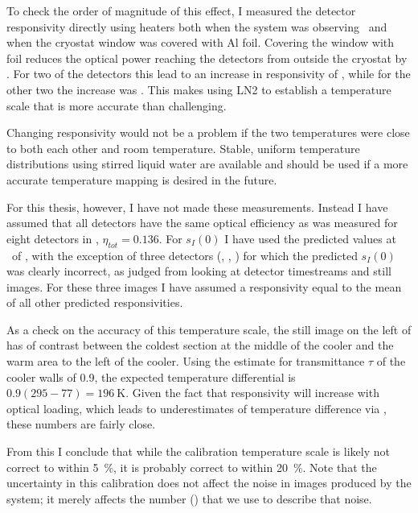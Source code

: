 To check the order of magnitude of this effect, I measured the detector responsivity directly using heaters both when the system was observing \ecco\ and when the cryostat window was covered with Al foil.
Covering the window with foil reduces the optical power reaching the detectors from outside the cryostat by .
For two of the detectors this lead to an increase in responsivity of , while for the other two the increase was .
This makes using LN2 to establish a temperature scale that is more accurate than  challenging.

Changing responsivity would not be a problem if the two temperatures were close to both each other and room temperature.
Stable, uniform temperature distributions using stirred liquid water are available \cite{dietlein_aqueous_2008} and should be used if a more accurate temperature mapping is desired in the future.

For this thesis, however, I have not made these measurements.
Instead I have assumed that all detectors have the same optical efficiency as was measured for eight detectors in , $\eta_{tot} = 0.136$.
For $s_I(0)$ I have used the predicted values at \SOC\ of , with the exception of three detectors (, , ) for which the predicted $s_I(0)$ was clearly incorrect, as judged from looking at detector timestreams and still images.
For these three images I have assumed a responsivity equal to the mean of all other predicted responsivities.

As a check on the accuracy of this temperature scale, the still image on the left of  has  of contrast between the coldest section at the middle of the cooler and the warm area to the left of the cooler.
Using the estimate for transmittance $\tau$ of the cooler walls of \num{0.9}, the expected temperature differential is $0.9(295-77) = \SI{196}{\K}$.
Given the fact that responsivity will increase with optical loading, which leads to underestimates of temperature difference via , these numbers are fairly close.

From this I conclude that while the calibration temperature scale is likely not correct to within \SI{5}{\percent}, it is probably correct to within \SI{20}{\percent}.
Note that the uncertainty in this calibration does not affect the noise in images produced by the system; it merely affects the number (\NETD) that we use to describe that noise.

